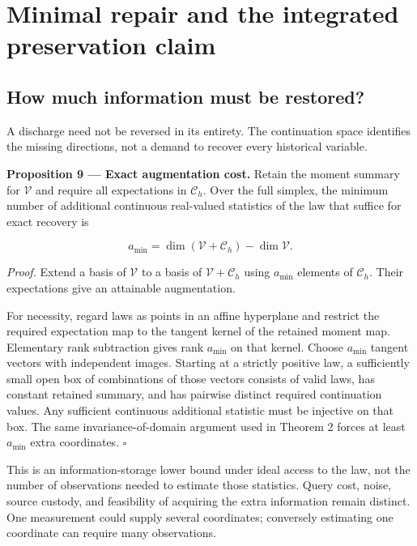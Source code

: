 \documentclass[11pt,a4paper]{article}
\begin{document}
\section{Minimal repair and the integrated preservation
claim}\label{minimal-repair-and-the-integrated-preservation-claim}

\subsection{How much information must be
restored?}\label{how-much-information-must-be-restored}

A discharge need not be reversed in its entirety. The continuation space
identifies the missing directions, not a demand to recover every
historical variable.


\textbf{Proposition 9 --- Exact augmentation cost.} Retain the moment
summary for \(\mathscr V\) and require all expectations in
\(\mathscr C_h\). Over the full simplex, the minimum number of
additional continuous real-valued statistics of the law that suffice for
exact recovery is

\nopagebreak[4]

\[
\boxed{
 a_{\min}=\dim(\mathscr V+\mathscr C_h)-\dim\mathscr V.
}
\]

\emph{Proof.} Extend a basis of \(\mathscr V\) to a basis of
\(\mathscr V+\mathscr C_h\) using \(a_{\min}\) elements of
\(\mathscr C_h\). Their expectations give an attainable augmentation.

For necessity, regard laws as points in an affine hyperplane and
restrict the required expectation map to the tangent kernel of the
retained moment map. Elementary rank subtraction gives rank \(a_{\min}\)
on that kernel. Choose \(a_{\min}\) tangent vectors with independent
images. Starting at a strictly positive law, a sufficiently small open
box of combinations of those vectors consists of valid laws, has
constant retained summary, and has pairwise distinct required
continuation values. Any sufficient continuous additional statistic must
be injective on that box. The same invariance-of-domain argument used in
Theorem 2 forces at least \(a_{\min}\) extra coordinates. \(\square\)

This is an information-storage lower bound under ideal access to the
law, not the number of observations needed to estimate those statistics.
Query cost, noise, source custody, and feasibility of acquiring the
extra information remain distinct. One measurement could supply several
coordinates; conversely estimating one coordinate can require many
observations.
\end{document}
